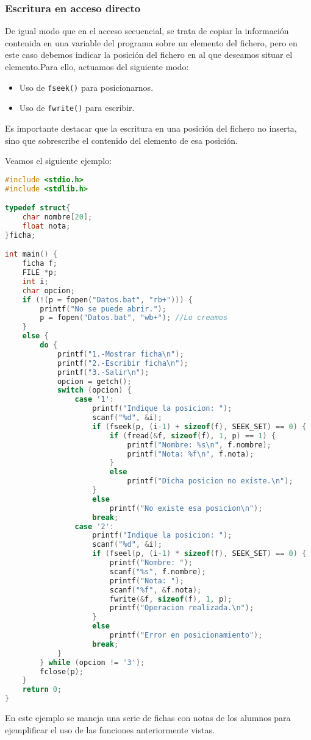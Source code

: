 {\subsubsection{Escritura en acceso directo}{
De igual modo que en el acceso secuencial, se trata de copiar la información contenida en una variable del programa sobre un elemento del fichero, pero en este caso debemos indicar la posición del fichero en al que deseamos situar el elemento.Para ello, actuamos del siguiente modo:
\begin{itemize}
	\item Uso de \texttt{fseek()} para posicionarnos.
	\item Uso de \texttt{fwrite()} para escribir.
\end{itemize}
Es importante destacar que la escritura en una posición del fichero no inserta, sino que sobrescribe el contenido del elemento de esa posición.\\
}

Veamos el siguiente ejemplo:
\begin{Ejemplo}
\begin{lstlisting}[language=C]
#include <stdio.h>
#include <stdlib.h>

typedef struct{
    char nombre[20];
    float nota;
}ficha;

int main() {
    ficha f;
    FILE *p;
    int i;
    char opcion;
    if (!(p = fopen("Datos.bat", "rb+"))) {
        printf("No se puede abrir.");
        p = fopen("Datos.bat", "wb+"); //Lo creamos
    }
    else {
        do {
            printf("1.-Mostrar ficha\n");
            printf("2.-Escribir ficha\n");
            printf("3.-Salir\n");
            opcion = getch();
            switch (opcion) {
                case '1':
                    printf("Indique la posicion: ");
                    scanf("%d", &i);
                    if (fseek(p, (i-1) + sizeof(f), SEEK_SET) == 0) {
                        if (fread(&f, sizeof(f), 1, p) == 1) {
                            printf("Nombre: %s\n", f.nombre);
                            printf("Nota: %f\n", f.nota);
                        }
                        else
                            printf("Dicha posicion no existe.\n");
                    }
                    else
                        printf("No existe esa posicion\n");
                    break;
                case '2':
                    printf("Indique la posicion: ");
                    scanf("%d", &i);
                    if (fseel(p, (i-1) * sizeof(f), SEEK_SET) == 0) {
                        printf("Nombre: ");
                        scanf("%s", f.nombre);
                        printf("Nota: ");
                        scanf("%f", &f.nota);
                        fwrite(&f, sizeof(f), 1, p);
                        printf("Operacion realizada.\n");
                    }
                    else
                        printf("Error en posicionamiento");
                    break;
            }
        } while (opcion != '3');
        fclose(p);
    }
    return 0;
}
\end{lstlisting}
\Explicacion
En este ejemplo se maneja una serie de fichas con notas de los alumnos para ejemplificar el uso de las funciones anteriormente vistas.
\end{Ejemplo}
}